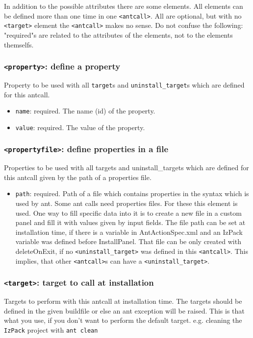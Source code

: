 In addition to the possible attributes there are some elements. All
elements can be defined more than one time in one
\texttt{<antcall>}. All are optional, but with no
\texttt{<target>} element the \texttt{<antcall>} makes no sense.
Do not confuse the following: "required"s are related to the
attributes of the elements, not to the elements themselfs.
\subsubsection{\label{tag:antproperty}\texttt{<property>}: define a property}
Property to be used with all \texttt{target}s and
\texttt{uninstall\_target}s which are defined for this antcall.
\begin{itemize}
    \item \texttt{name}: required. The name (id) of the property.
    \item \texttt{value}: required. The value of the property.
\end{itemize}
\subsubsection{\label{tag:antpropertyfile}\texttt{<propertyfile>}: define properties in a file}
Properties to be used with all targets and uninstall\_targets which
are defined for this antcall given by the path of a properties
file.
\begin{itemize}
    \item \texttt{path}: required. Path of a file which contains
    properties in the syntax which is used by ant. Some ant calls
    need properties files. For these this element is used. One
    way to fill specific data into it is to create a new file in
    a custom panel and fill it with values given by input fields.
    The file path can be set at installation time, if there is a
    variable in AntActionSpec.xml and an IzPack variable was
    defined before InstallPanel. That file can be only created
    with deleteOnExit, if no \texttt{<uninstall\_target>} was defined in
    this \texttt{<antcall>}. This implies, that other \texttt{<antcall>}s can
    have a \texttt{<uninstall\_target>}.
\end{itemize}

\subsubsection{\label{tag:anttarget}\texttt{<target>}: target to call at installation}
Targets to perform with this antcall at installation time. The
targets should be defined in the given buildfile or else an ant
exception will be raised. This is that what you use, if you don't want
to perform the default target. e.g. cleaning the \texttt{IzPack} project with 
\texttt{ant clean}


